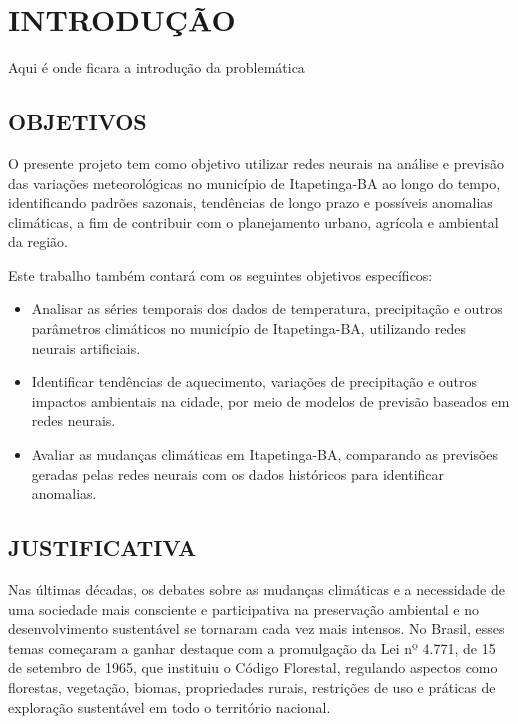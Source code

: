 \chapter{INTRODUÇÃO}

Aqui é onde ficara a introdução da problemática

\section{OBJETIVOS}
    O presente projeto tem como objetivo utilizar redes neurais na análise e previsão das variações meteorológicas no 
    município de Itapetinga-BA ao longo do tempo, identificando padrões sazonais, tendências de longo prazo e 
    possíveis anomalias climáticas, a fim de contribuir com o planejamento urbano, agrícola e ambiental da região.
    
    Este trabalho também contará com os seguintes objetivos específicos:

    \begin{itemize}
        \item Analisar as séries temporais dos dados de temperatura, precipitação e outros 
              parâmetros climáticos no município de Itapetinga-BA, utilizando redes neurais artificiais.
        \item Identificar tendências de aquecimento, variações de precipitação e outros 
              impactos ambientais na cidade, por meio de modelos de previsão baseados em redes neurais.
        \item Avaliar as mudanças climáticas em Itapetinga-BA, comparando as previsões 
              geradas pelas redes neurais com os dados históricos para identificar anomalias.
    \end{itemize}

\section{JUSTIFICATIVA}
    Nas últimas décadas, os debates sobre as mudanças climáticas e a necessidade de uma sociedade mais consciente e 
    participativa na preservação ambiental e no desenvolvimento sustentável se tornaram cada vez mais intensos. 
    No Brasil, esses temas começaram a ganhar destaque com a promulgação da Lei nº 4.771, de 15 de setembro de 1965, 
    que instituiu o Código Florestal, regulando aspectos como florestas, vegetação, biomas, propriedades rurais, 
    restrições de uso e práticas de exploração sustentável em todo o território nacional.
    
